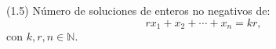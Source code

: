 
(1.5) Número de soluciones de enteros no negativos de:
\[
  r x_1 + x_2 + \cdots + x_n = k r,
\]
con $k, r, n \in \mathbb{N}$.

